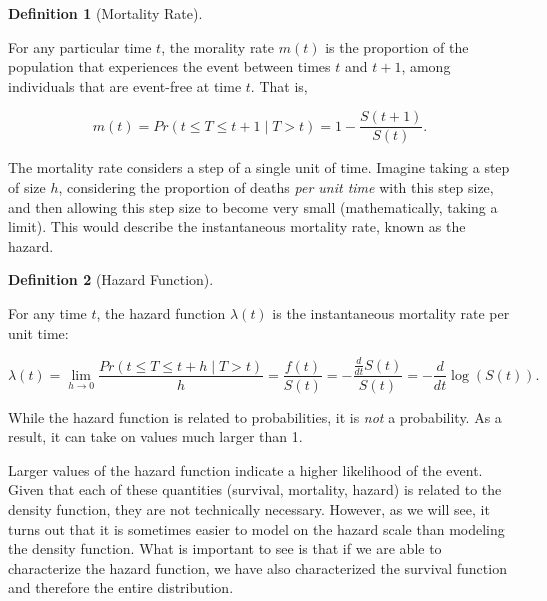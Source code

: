 \documentclass[
  letterpaper,
  DIV=11,
  numbers=noendperiod]{scrreprt}
\theoremstyle{definition}
\newtheorem{definition}{Definition}[chapter]
\theoremstyle{definition}
\theoremstyle{remark}
\begin{document}
\begin{definition}[Mortality
Rate]\protect\hypertarget{def-mortality}{}\label{def-mortality}

For any particular time \(t\), the morality rate \(m(t)\) is the
proportion of the population that experiences the event between times
\(t\) and \(t + 1\), among individuals that are event-free at time
\(t\). That is,

\[m(t) = Pr(t \leq T \leq t + 1 \mid T > t) = 1 - \frac{S(t + 1)}{S(t)}.\]

\end{definition}

The mortality rate considers a step of a single unit of time. Imagine
taking a step of size \(h\), considering the proportion of deaths
\emph{per unit time} with this step size, and then allowing this step
size to become very small (mathematically, taking a limit). This would
describe the instantaneous mortality rate, known as the hazard.

\begin{definition}[Hazard
Function]\protect\hypertarget{def-hazard}{}\label{def-hazard}

For any time \(t\), the hazard function \(\lambda(t)\) is the
instantaneous mortality rate per unit time:

\[\lambda(t) = \lim_{h \rightarrow 0} \frac{Pr(t \leq T \leq t + h \mid T > t)}{h} = \frac{f(t)}{S(t)} = -  \frac{\frac{d}{dt} S(t)}{S(t)} = -\frac{d}{dt} \log(S(t)).\]

\end{definition}

\begin{tcolorbox}[enhanced jigsaw, left=2mm, toprule=.15mm, arc=.35mm, breakable, opacitybacktitle=0.6, opacityback=0, rightrule=.15mm, colbacktitle=quarto-callout-warning-color!10!white, coltitle=black, leftrule=.75mm, toptitle=1mm, colframe=quarto-callout-warning-color-frame, titlerule=0mm, title=\textcolor{quarto-callout-warning-color}{\faExclamationTriangle}\hspace{0.5em}{Warning}, bottomrule=.15mm, colback=white, bottomtitle=1mm]

While the hazard function is related to probabilities, it is \emph{not}
a probability. As a result, it can take on values much larger than 1.

\end{tcolorbox}

Larger values of the hazard function indicate a higher likelihood of the
event. Given that each of these quantities (survival, mortality, hazard)
is related to the density function, they are not technically necessary.
However, as we will see, it turns out that it is sometimes easier to
model on the hazard scale than modeling the density function. What is
important to see is that if we are able to characterize the hazard
function, we have also characterized the survival function and therefore
the entire distribution.
\end{document}
